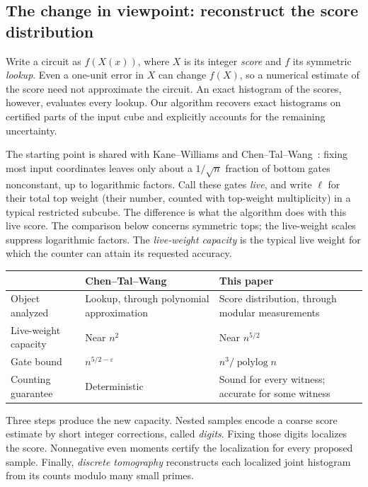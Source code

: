 \documentclass[11pt,letterpaper]{article}
\theoremstyle{definition}
\theoremstyle{remark}
\begin{document}
\subsection{The change in viewpoint: reconstruct the score distribution}

Write a circuit as \(f(X(x))\), where \(X\) is its integer
\emph{score} and \(f\) its symmetric \emph{lookup}. Even a one-unit
error in \(X\) can change \(f(X)\), so a numerical estimate of the
score need not approximate the circuit. An exact histogram of the
scores, however, evaluates every lookup. Our algorithm recovers
exact histograms on certified parts of the input cube and explicitly
accounts for the remaining uncertainty.

The starting point is shared with Kane--Williams and
Chen--Tal--Wang~\cite{KW16,CTW26}: fixing most input coordinates
leaves only about a \(1/\sqrt n\) fraction of bottom gates
nonconstant, up to logarithmic factors. Call these gates
\emph{live}, and write \(\ell\) for their total top weight (their
number, counted with top-weight multiplicity) in a typical restricted
subcube. The difference is what the algorithm does with
this live score. The comparison below concerns symmetric tops;
the live-weight scales suppress logarithmic factors. The
\emph{live-weight capacity} is the typical live weight for which
the counter can attain its requested accuracy.

\begin{center}\small
\begin{tabularx}{\textwidth}{@{}>{\raggedright\arraybackslash}p{}
 >{\raggedright\arraybackslash}X>{\raggedright\arraybackslash}X@{}}
\toprule
 & Chen--Tal--Wang~\cite{CTW26} & This paper\\
\midrule
Object analyzed & Lookup, through polynomial approximation &
Score distribution, through modular measurements\\
Live-weight capacity & Near \(n^2\) & Near \(n^{5/2}\)\\
Gate bound & \(n^{5/2-\varepsilon}\) & \(n^3/\operatorname{polylog}n\)\\
Counting guarantee & Deterministic & Sound for every witness;
accurate for some witness\\
\bottomrule
\end{tabularx}
\end{center}

Three steps produce the new capacity. Nested samples encode a coarse
score estimate by short integer corrections, called \emph{digits}.
Fixing those digits localizes the score. Nonnegative even moments
certify the localization for every proposed sample. Finally,
\emph{discrete tomography} reconstructs each localized joint
histogram from its counts modulo many small primes.
\end{document}
